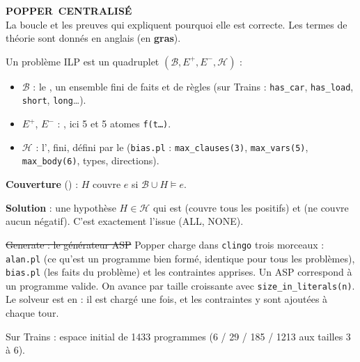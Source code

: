 \documentclass[10pt]{article}
\begin{document}
{\fontsize{24}{26}\selectfont\bfseries\textcolor{marine}{POPPER}~CENTRALISÉ}\\[2pt]
{\normalsize La boucle  et les preuves qui expliquent pourquoi elle est correcte.
Les termes de théorie sont donnés en anglais (en \textbf{gras}).}

Un problème ILP est un quadruplet $(\mathcal{B},E^+,E^-,\mathcal{H})$ :
\begin{itemize}
  \item $\mathcal{B}$ : le , un ensemble fini de faits et de règles (sur Trains : \texttt{has\_car}, \texttt{has\_load}, \texttt{short}, \texttt{long}\ldots).
  \item $E^+$, $E^-$ : , ici 5 et 5 atomes \texttt{f(t\ldots)}.
  \item $\mathcal{H}$ : l', fini, défini par le 
        (\texttt{bias.pl} : \texttt{max\_clauses(3)}, \texttt{max\_vars(5)}, \texttt{max\_body(6)}, types, directions).
\end{itemize}
\textbf{Couverture} () : $H$ couvre $e$ si $\mathcal{B}\cup H\models e$.\par\vspace{2pt}
\textbf{Solution} : une hypothèse $H\in\mathcal{H}$ qui est  (couvre tous les positifs) et  (ne couvre aucun négatif).
C'est exactement l'issue (ALL, NONE).


\st{Generate : le générateur ASP}
Popper charge dans \texttt{clingo} trois morceaux : \texttt{alan.pl} (ce qu'est un programme bien formé, identique pour tous les problèmes),
\texttt{bias.pl} (les faits du problème) et les contraintes apprises. Un  ASP correspond à un programme valide.
On avance par taille croissante avec \texttt{size\_in\_literals(n)}. Le solveur est en  : il est chargé une fois, et les contraintes y sont ajoutées à chaque tour.\par\vspace{2pt}
Sur Trains : espace initial de 1433 programmes (6 / 29 / 185 / 1213 aux tailles 3 à 6).
\end{document}
